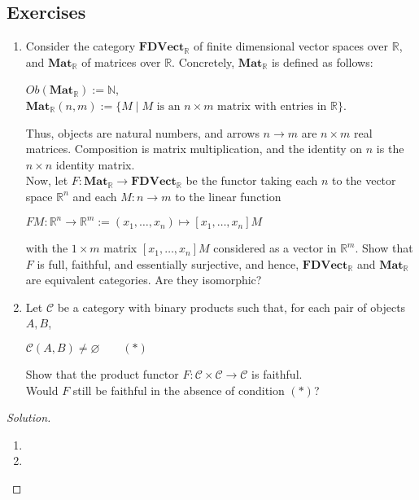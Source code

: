 \documentclass[]{amsbook}
\newcommand{\qq}{\qquad}
\newcommand{\catname}[1]{\mathbf{#1}}
\newcommand{\N}{\mathbb{N}}
\newcommand{\R}{\mathbb{R}}
\newcommand{\0}{\mathbf{0}}
\newcommand{\1}{\mathbf{1}}
\renewcommand{\emptyset}{\varnothing}
\newcommand{\mc}[1]{\mathcal{#1}}
\newenvironment{solution}
    {\begin{proof}[Solution]}{\end{proof}}
\begin{document}
\subsection*{Exercises}
\leavevmode
\begin{enumerate}
    \item Consider the category $\catname{FDVect}_{\R}$ of finite dimensional
    vector spaces over $\R$, and $\catname{Mat}_{\R}$ of matrices over $\R$.
    Concretely, $\catname{Mat}_{\R}$ is defined as follows:
    \begin{center}
        $Ob(\catname{Mat}_{\R}) := \N$,\\
        $\catname{Mat}_{\R}(n, m) := \{ M \mid M \text{ is an } n \times m
        \text{ matrix with entries in } \R \}$.
    \end{center}
    Thus, objects are natural numbers, and arrows $n \to m$ are $n \times m$
    real matrices. Composition is matrix multiplication, and the identity on
    $n$ is the $n \times n$ identity matrix.\\
    Now, let $F: \catname{Mat}_{\R} \to \catname{FDVect}_{\R}$ be the functor
    taking each $n$ to the vector space $\R^n$ and each $M: n \to m$ to the
    linear function
    \begin{center}
        $FM: \R^n \to \R^m := (x_1, \ldots, x_n) \mapsto [x_1, \ldots, x_n] M$
    \end{center}
    with the $1 \times m$ matrix $[x_1, \ldots, x_n] M$ considered as a vector
    in $\R^m$. Show that $F$ is full, faithful, and essentially surjective, and
    hence, $\catname{FDVect}_{\R}$ and $\catname{Mat}_{\R}$ are equivalent
    categories. Are they isomorphic?

    \item Let $\mc{C}$ be a category with binary products such that, for each
    pair of objects $A, B$,
    \begin{center}
        $\mc{C}(A, B) \neq \emptyset \qq (*)$
    \end{center}
    Show that the product functor $F: \mc{C} \times \mc{C} \to \mc{C}$ is
    faithful.\\
    Would $F$ still be faithful in the absence of condition $(*)$?
\end{enumerate}
\begin{solution}
\leavevmode
\begin{enumerate}
    \item %
    \item %
\end{enumerate}
\end{solution}
\end{document}

